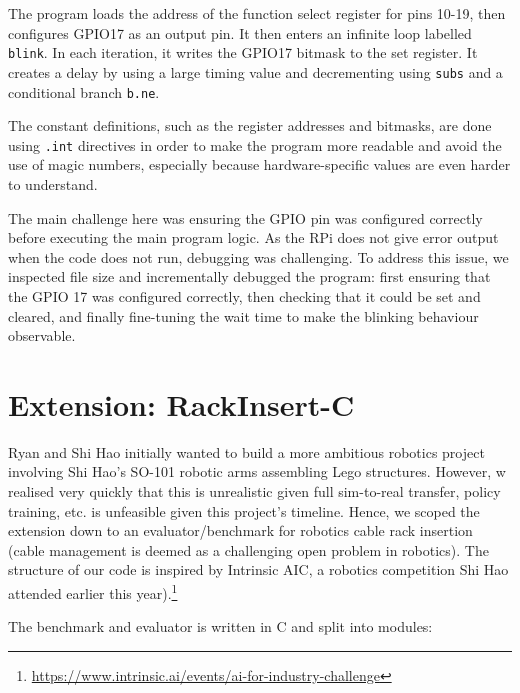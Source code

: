 \documentclass[11pt]{article}
\begin{document}
The program loads the address of the function select register for pins 10-19, then configures GPIO17 as an output pin. It then enters an infinite loop labelled \texttt{blink}. In each iteration, it writes the GPIO17 bitmask to the set register. It creates a delay by using a large timing value and decrementing using \texttt{subs} and a conditional branch \texttt{b.ne}.

The constant definitions, such as the register addresses and bitmasks, are done using \texttt{.int} directives in order to make the program more readable and avoid the use of magic numbers, especially because hardware-specific values are even harder to understand.

The main challenge here was ensuring the GPIO pin was configured correctly before executing the main program logic. As the RPi does not give error output when the code does not run, debugging was challenging. To address this issue, we inspected file size and incrementally debugged the program: first ensuring that the GPIO 17 was configured correctly, then checking that it could be set and cleared, and finally fine-tuning the wait time to make the blinking behaviour observable.

\section{Extension: RackInsert-C}

Ryan and Shi Hao initially wanted to build a more ambitious robotics project involving Shi Hao's SO-101 robotic arms assembling Lego structures. However, w realised very quickly that this is unrealistic given full sim-to-real transfer, policy training, etc. is unfeasible given this project's timeline. Hence, we scoped the extension down to an evaluator/benchmark for robotics cable rack insertion (cable management is deemed as a challenging open problem in robotics). The structure of our code is inspired by Intrinsic AIC, a robotics competition Shi Hao attended earlier this year).\footnote{\url{https://www.intrinsic.ai/events/ai-for-industry-challenge}}

The benchmark and evaluator is written in C and split into modules: 
\end{document}
